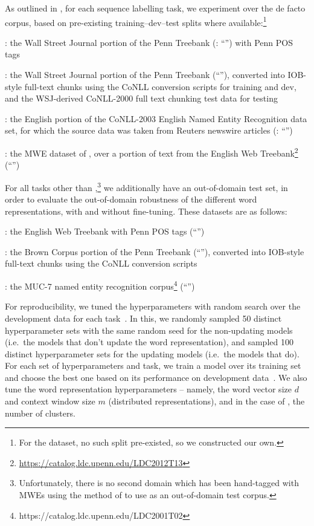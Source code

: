 As outlined in , for each sequence labelling task, we
experiment over the de facto corpus, based on pre-existing
training--dev--test splits where available:\footnote{For the \mwe
  dataset, no such split pre-existed, so we constructed our own.}
\begin{compactenum}
\item[\textbf{\pos}:] the Wall Street Journal portion of the Penn
  Treebank (: ``\WSJ'')
  with Penn POS tags
\item[\textbf{\chunking}:] the Wall Street Journal portion of the Penn
  Treebank (``\WSJ''),
  converted into IOB-style full-text chunks using the CoNLL conversion
  scripts for training and dev, and the WSJ-derived CoNLL-2000 full text chunking
  test data for testing \cite{TjongKimSang:Buchholz:2000}
\item[\textbf{\ner}:] the English portion of the CoNLL-2003 English Named Entity Recognition
  data set, for which the source data was taken from Reuters newswire
  articles (: ``\Reuters'')
\item[\textbf{\mwe}:] the MWE dataset of , over a portion of text from the
  English Web Treebank\footnote{\url{https://catalog.ldc.upenn.edu/LDC2012T13}} (``\EWT'')
\end{compactenum}
 For all tasks other
than \mwe,\footnote{Unfortunately, there is no
  second domain which has been hand-tagged with MWEs using the method of
   to use as an out-of-domain test corpus.} we
additionally have an out-of-domain test set, in order to evaluate the
out-of-domain robustness of the different word representations, with and
without fine-tuning. These datasets are as follows:
\begin{compactenum}
\item[\textbf{\pos}:] the English Web Treebank with Penn POS tags (``\EWT'')
\item[\textbf{\chunking}:] the Brown Corpus portion of the Penn
  Treebank (``\Brown''), 
  converted into IOB-style full-text chunks using the CoNLL conversion
  scripts
\item[\textbf{\ner}:] the MUC-7 named entity recognition corpus\footnote{https://catalog.ldc.upenn.edu/LDC2001T02} (``\MUC'')
\end{compactenum}

For reproducibility, we tuned the hyperparameters with random search
over the development data for each task~\cite{bergstra2012random}. 
In this, we randomly sampled 50 distinct hyperparameter sets with the
same random seed for the non-updating models (i.e.\ the models that
don't update the word representation), and
sampled 100 distinct hyperparameter sets for the updating models (i.e.\
the models that do). 
For each set of hyperparameters and task, we train a model over its
training set and choose the best one based on its performance on development data~\cite{turian2010word}. 
We also tune the word representation hyperparameters -- namely, the word
vector size $d$ and context window size $m$ (distributed
representations), and in the case of \Brown, the number of clusters.

